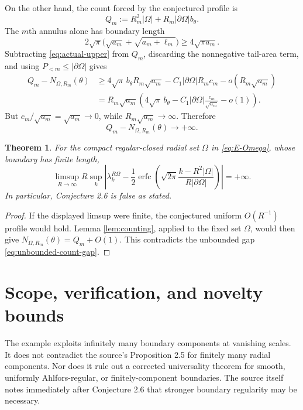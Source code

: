 \documentclass[11pt]{article}
\newtheorem{theorem}{Theorem}
\newcommand{\erfc}{\operatorname{erfc}}
\begin{document}
On the other hand, the count forced by the conjectured profile is
\[
 Q_m:=R_m^2|\Omega|+R_m|\partial\Omega|b_\theta.
\]
The $m$th annulus alone has boundary length
\[
 2\sqrt\pi\bigl(\sqrt{a_m}+\sqrt{a_m+\ell_m}\bigr)
 \geq4\sqrt{\pi a_m}.
\]
Subtracting \eqref{eq:actual-upper} from $Q_m$, discarding the nonnegative
tail-area term, and using $P_{<m}\leq|\partial\Omega|$ gives
\begin{align*}
 Q_m-N_{\Omega,R_m}(\theta)
 &\geq4\sqrt\pi\,b_\theta R_m\sqrt{a_m}
 -C_1|\partial\Omega|R_mc_m
 -o(R_m\sqrt{a_m})\\
 &=R_m\sqrt{a_m}\left(4\sqrt\pi\,b_\theta
 -C_1|\partial\Omega|\frac{c_m}{\sqrt{a_m}}-o(1)\right).
\end{align*}
But $c_m/\sqrt{a_m}=\sqrt{a_m}\to0$, while
$R_m\sqrt{a_m}\to\infty$.  Therefore
\begin{equation}\label{eq:unbounded-count-gap}
 Q_m-N_{\Omega,R_m}(\theta)\longrightarrow+\infty.
\end{equation}

\begin{theorem}\label{thm:counterexample}
For the compact regular-closed radial set $\Omega$ in
\eqref{eq:E-Omega}, whose boundary has finite length,
\[
 \limsup_{R\to\infty}R\sup_k\left|\lambda_k^{R\Omega}
 -\frac12\erfc\!\left(
 \sqrt{2\pi}\frac{k-R^2|\Omega|}{R|\partial\Omega|}
 \right)\right|=+\infty.
\]
In particular, Conjecture 2.6 is false as stated.
\end{theorem}

\begin{proof}
If the displayed limsup were finite, the conjectured uniform $O(R^{-1})$
profile would hold.  Lemma \ref{lem:counting}, applied to the fixed set
$\Omega$, would then give
$N_{\Omega,R_m}(\theta)=Q_m+O(1)$.  This contradicts the unbounded gap
\eqref{eq:unbounded-count-gap}.
\end{proof}

\section{Scope, verification, and novelty bounds}

The example exploits infinitely many boundary components at vanishing scales.
It does not contradict the source's Proposition 2.5 for finitely many radial
components.  Nor does it rule out a corrected universality theorem for smooth,
uniformly Ahlfors-regular, or finitely-component boundaries.  The source itself
notes immediately after Conjecture 2.6 that stronger boundary regularity may
be necessary.
\end{document}
